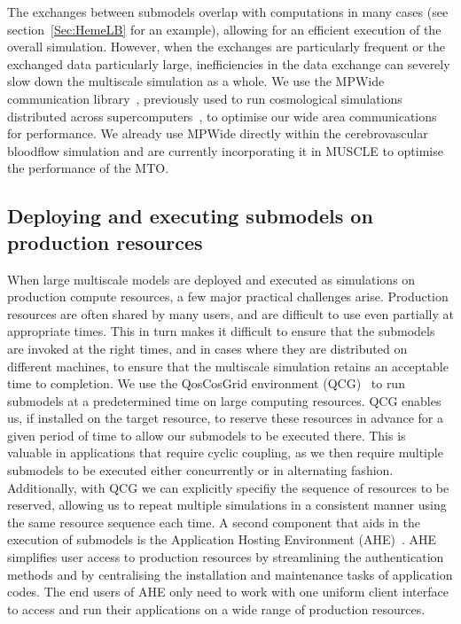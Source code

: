 \documentclass[a4,10pt]{article}
\begin{document}
The exchanges between submodels overlap with computations in many cases
(see section~\ref{Sec:HemeLB} for an example), allowing for an efficient
execution of the overall simulation. However, when the exchanges are
particularly frequent or the exchanged data particularly large, inefficiencies
in the data exchange can severely slow down the multiscale simulation as a
whole. We use the MPWide communication library~\cite{mpwide}, previously used
to run cosmological simulations distributed across supercomputers~\cite{sushi},
to optimise our wide area communications for performance. We already use MPWide
directly within the cerebrovascular bloodflow simulation and are currently
incorporating it in MUSCLE to optimise the performance of the MTO.

\subsection{Deploying and executing submodels on production resources}

When large multiscale models are deployed and executed as simulations on
production compute resources, a few major practical challenges arise. 
Production resources are often shared by many users, and are difficult to use
even partially at appropriate times. This in turn makes it difficult to ensure
that the submodels are invoked at the right times, and in cases where they are
distributed on different machines, to ensure that the multiscale simulation
retains an acceptable time to completion. We use the QosCosGrid environment
(QCG)~\cite{Kurowski:2010} to run submodels at a predetermined time on large
computing resources. QCG enables us, if installed on the target resource, to
reserve these resources in advance for a given period of time to allow our
submodels to be executed there. This is valuable in applications that require
cyclic coupling, as we then require multiple submodels to be executed either
concurrently or in alternating fashion. Additionally, with QCG we can
explicitly specifiy the sequence of resources to be reserved, allowing us to
repeat multiple simulations in a consistent manner using the same resource
sequence each time. A second component that aids in the execution of submodels
is the Application Hosting Environment (AHE)~\cite{Zasada:2009}. AHE simplifies
user access to production resources by streamlining the authentication methods
and by centralising the installation and maintenance tasks of application
codes. The end users of AHE only need to work with one uniform client interface to
access and run their applications on a wide range of production resources.
\end{document}
